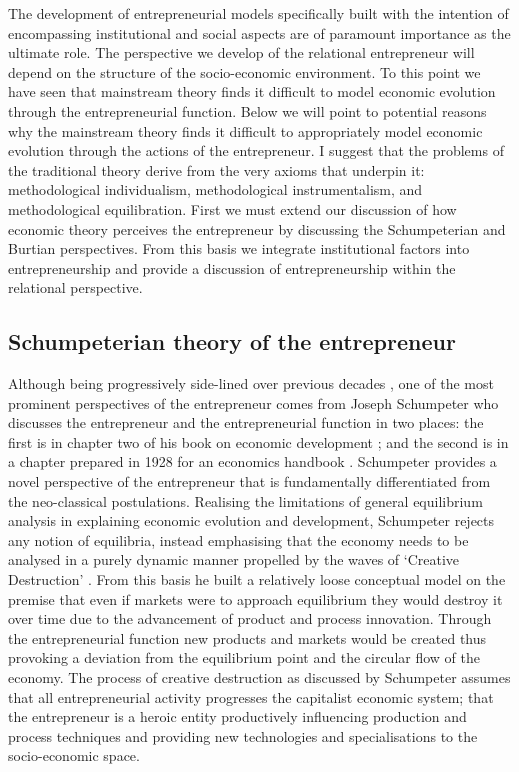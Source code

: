 The development of entrepreneurial models specifically built with the intention of encompassing institutional and social aspects are of paramount importance as the ultimate role. The perspective we develop of the relational entrepreneur will depend on the structure of the socio-economic environment. To this point we have seen that mainstream theory finds it difficult to model economic evolution through the entrepreneurial function. Below we will point to potential reasons why the mainstream theory finds it difficult to appropriately model economic evolution through the actions of the entrepreneur. I suggest that the problems of the traditional theory derive from the very axioms that underpin it: methodological individualism, methodological instrumentalism, and methodological equilibration. First we must extend our discussion of how economic theory perceives the entrepreneur by discussing the Schumpeterian and Burtian perspectives. From this basis we integrate institutional factors into entrepreneurship and provide a discussion of entrepreneurship within the relational perspective.

\subsection{Schumpeterian theory of the entrepreneur}

Although being progressively side-lined over previous decades \citep{Aldrich2005}, one of the most prominent perspectives of the entrepreneur comes from Joseph Schumpeter who discusses the entrepreneur and the entrepreneurial function in two places: the first is in chapter two of his book on economic development \citep{Schumpeter1934}; and the second is in a chapter prepared in 1928 for an economics handbook \citep{Schumpeter2003}. Schumpeter provides a novel perspective of the entrepreneur that is fundamentally differentiated from the neo-classical postulations. Realising the limitations of general equilibrium analysis in explaining economic evolution and development, Schumpeter rejects any notion of equilibria, instead emphasising that the economy needs to be analysed in a purely dynamic manner propelled by the waves of `Creative Destruction' \citep{Schumpeter1942}. From this basis he built a relatively loose conceptual model on the premise that even if markets were to approach equilibrium they would destroy it over time due to the advancement of product and process innovation. Through the entrepreneurial function new products and markets would be created thus provoking a deviation from the equilibrium point and the circular flow of the economy. The process of creative destruction as discussed by Schumpeter assumes that all entrepreneurial activity progresses the capitalist economic system; that the entrepreneur is a heroic entity productively influencing production and process techniques and providing new technologies and specialisations to the socio-economic space.

